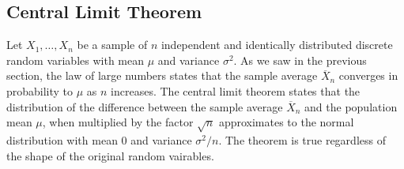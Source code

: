 
\subsection{Central Limit Theorem}

Let $X_1, \ldots, X_n$ be a sample of $n$ independent and identically distributed discrete random variables with mean $\mu$ and variance $\sigma^2$. As we saw in the previous section, the law of large numbers states that the sample average $\overline {X}_n$ converges in probability to $\mu$ as $n$ increases. The central limit theorem states that the distribution of the difference between the sample average $\overline {X}_n$ and the population mean $\mu$, when multiplied by the factor $\sqrt {n}$ approximates to the normal distribution with mean $0$ and variance $\sigma^2 / n$. The theorem is true regardless of the shape of the original random vairables.

